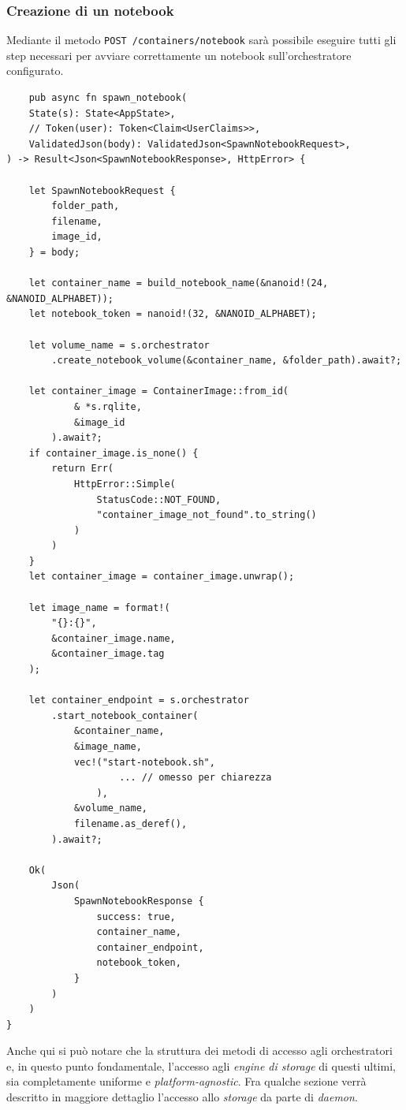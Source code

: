 \subsubsection{Creazione di un notebook}
Mediante il metodo \verb|POST /containers/notebook| sarà possibile eseguire tutti gli step necessari per avviare correttamente un notebook sull'orchestratore configurato.
\begin{verbatim}
    pub async fn spawn_notebook(
    State(s): State<AppState>,
    // Token(user): Token<Claim<UserClaims>>,
    ValidatedJson(body): ValidatedJson<SpawnNotebookRequest>,
) -> Result<Json<SpawnNotebookResponse>, HttpError> {

    let SpawnNotebookRequest {
        folder_path,
        filename,
        image_id,
    } = body;

    let container_name = build_notebook_name(&nanoid!(24, &NANOID_ALPHABET));
    let notebook_token = nanoid!(32, &NANOID_ALPHABET);

    let volume_name = s.orchestrator
        .create_notebook_volume(&container_name, &folder_path).await?;

    let container_image = ContainerImage::from_id(
            & *s.rqlite, 
            &image_id
        ).await?;
    if container_image.is_none() {
        return Err(
            HttpError::Simple(
                StatusCode::NOT_FOUND, 
                "container_image_not_found".to_string()
            )
        )
    }
    let container_image = container_image.unwrap();
    
    let image_name = format!(
        "{}:{}", 
        &container_image.name, 
        &container_image.tag
    );
    
    let container_endpoint = s.orchestrator
        .start_notebook_container(
            &container_name,
            &image_name,
            vec!("start-notebook.sh",
                    ... // omesso per chiarezza
                ),
            &volume_name,
            filename.as_deref(),
        ).await?;

    Ok(
        Json(
            SpawnNotebookResponse {
                success: true,
                container_name,
                container_endpoint,
                notebook_token,
            }
        )
    )
}

\end{verbatim}
Anche qui si può notare che la struttura dei metodi di accesso agli orchestratori e, in questo punto fondamentale, l'accesso agli \textit{engine di storage} di questi ultimi, sia completamente uniforme e \textit{platform-agnostic}. Fra qualche sezione verrà descritto in maggiore dettaglio l'accesso allo \textit{storage} da parte di \textit{daemon}.

